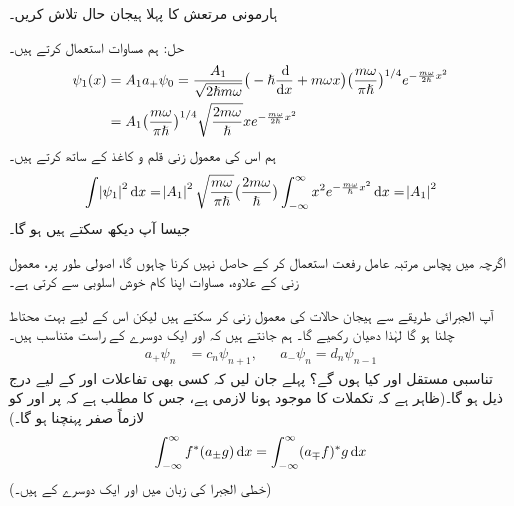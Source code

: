 ہارمونی مرتعش کا پہلا ہیجان حال تلاش کریں۔ 

حل:\quad
 ہم مساوات  استعمال کرتے ہیں۔ 
\begin{gather}
\begin{aligned}\label{مساوات_شروڈنگر_ہارمونی_ہیجان_حالات}
\psi_1 (x) &= A_1 a_+ \psi_0 = \frac{ A_1 }{ \sqrt{ 2 \hslash m \omega } } \big( -\hslash \frac{\dif}{\dif x} + m \omega x\big) \big( \frac{ m \omega}{ \pi \hslash} \big)^{1/4} e^{-\frac{ m \omega }{ 2 \hslash } x^2}\\
 &= A_1 \big( \frac{ m \omega }{ \pi \hslash}\big)^{1/4} \sqrt{ \frac{ 2 m \omega }{ \hslash} } x e^{-\frac{ m \omega }{ 2 \hslash } x^2}
\end{aligned}
\end{gather}
ہم اس کی معمول زنی قلم و کاغذ کے ساتھ کرتے ہیں۔ 
\begin{align*}
\int \abs{\psi_1}^2 \dif x = \abs{A_1 }^2 \sqrt{ \frac{ m \omega}{ \pi \hslash } } \big( \frac{ 2 m \omega }{ \hslash} \big ) \int_{ - \infty }^{ \infty } x^2 e^{-\frac{ m \omega }{ \hslash } x^2} \dif x = \abs{A_1}^2
\end{align*} 
جیسا آپ دیکھ سکتے ہیں  ہو گا۔
 
اگرچہ میں پچاس مرتبہ عامل رفعت استعمال کر کے  حاصل نہیں کرنا چاہوں گا، اصولی طور پر، معمول زنی کے علاوہ، مساوات  اپنا کام خوش اسلوبی سے کرتی ہے۔

 آپ الجبرائی طریقے سے ہیجان حالات کی معمول زنی کر سکتے ہیں لیکن اس کے لیے بہت محتاط چلنا ہو گا لہٰذا دھیان رکھیے گا۔ ہم جانتے ہیں کہ 
 اور  ایک دوسرے کے راست متناسب ہیں۔ 
\begin{align} 
a_+ \psi_n&= c_n \psi_{n+1} , && a_- \psi_n = d_n \psi_{n-1}
\end{align} 
 تناسبی مستقل  اور  کیا ہوں گے؟ پہلے جان لیں کہ کسی بھی تفاعلات  اور  کے لیے درج ذیل ہو گا۔(ظاہر ہے کہ تکملات کا موجود ہونا لازمی ہے، جس کا مطلب ہے کہ  پر  اور  کو لازماً صفر پہنچنا ہو گا۔)
\begin{align}\label{مساوات_شروڈنگر_سیڑھی_متبادل}
\int_{ - \infty }^{ \infty } f^*( a_{\pm} g ) \dif x = \int_{ - \infty }^{ \infty } ( a_{\mp} f)^* g \dif x
\end{align}
(خطی الجبرا کی زبان میں  اور  ایک دوسرے کے  ہیں۔)


